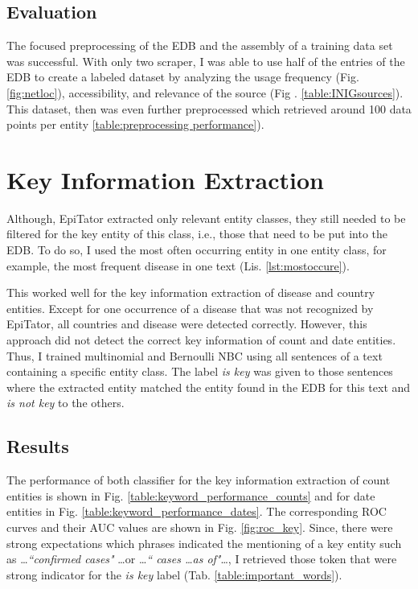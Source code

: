\subsection{Evaluation}
  The focused preprocessing of the EDB and the assembly of a training data set was successful.
  With only two scraper, I was able to use half of the entries of the EDB to create a labeled dataset by analyzing the usage frequency (Fig. \ref{fig:netloc}), accessibility, and relevance of the source (Fig . \ref{table:INIGsources}).
  This dataset, then was even further preprocessed which retrieved around 100 data points per entity \ref{table:preprocessing performance}).

\section{Key Information Extraction}
  Although, EpiTator extracted only relevant entity classes, they still needed to be filtered for the key entity of this class, i.e., those that need to be put into the EDB.
  To do so, I used the most often occurring entity in one entity class, for example, the most frequent disease in one text (Lis. \ref{lst:mostoccure}).

  This worked well for the key information extraction of disease and country entities.
  Except for one occurrence of a disease that was not recognized by EpiTator, all countries and disease were detected correctly.
  However, this approach did not detect the correct key information of count and date entities.
  Thus, I trained multinomial and Bernoulli NBC using all sentences of a text containing a specific entity class.
  The label \textsl{is key} was given to those sentences where the extracted entity matched the entity found in the EDB for this text and \textsl{is not key} to the others.

\subsection{Results}
  The performance of both classifier for the key information extraction of count entities is shown in Fig. \ref{table:keyword_performance_counts} and for date entities in Fig. \ref{table:keyword_performance_dates}. The corresponding ROC curves and their AUC values are shown in Fig. \ref{fig:roc_key}. Since, there were strong expectations which phrases indicated the mentioning of a key entity such as \dots \textit{``confirmed cases"} \dots or \dots \textit{`` cases \dots as of"}\dots, I retrieved those token that were strong indicator for the \textsl{is key} label (Tab. \ref{table:important_words}).

